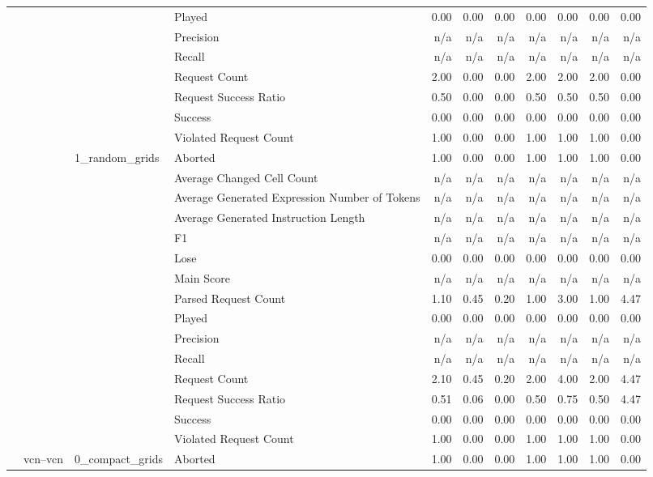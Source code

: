 \begin{tabular}{llllrrrrrrr}
 &  &  & Played & 0.00 & 0.00 & 0.00 & 0.00 & 0.00 & 0.00 & 0.00 \\
 &  &  & Precision & n/a & n/a & n/a & n/a & n/a & n/a & n/a \\
 &  &  & Recall & n/a & n/a & n/a & n/a & n/a & n/a & n/a \\
 &  &  & Request Count & 2.00 & 0.00 & 0.00 & 2.00 & 2.00 & 2.00 & 0.00 \\
 &  &  & Request Success Ratio & 0.50 & 0.00 & 0.00 & 0.50 & 0.50 & 0.50 & 0.00 \\
 &  &  & Success & 0.00 & 0.00 & 0.00 & 0.00 & 0.00 & 0.00 & 0.00 \\
 &  &  & Violated Request Count & 1.00 & 0.00 & 0.00 & 1.00 & 1.00 & 1.00 & 0.00 \\
\cline{3-11}
 &  & \multirow[t]{15}{*}{1_random_grids} & Aborted & 1.00 & 0.00 & 0.00 & 1.00 & 1.00 & 1.00 & 0.00 \\
 &  &  & Average Changed Cell Count & n/a & n/a & n/a & n/a & n/a & n/a & n/a \\
 &  &  & Average Generated Expression Number of Tokens & n/a & n/a & n/a & n/a & n/a & n/a & n/a \\
 &  &  & Average Generated Instruction Length & n/a & n/a & n/a & n/a & n/a & n/a & n/a \\
 &  &  & F1 & n/a & n/a & n/a & n/a & n/a & n/a & n/a \\
 &  &  & Lose & 0.00 & 0.00 & 0.00 & 0.00 & 0.00 & 0.00 & 0.00 \\
 &  &  & Main Score & n/a & n/a & n/a & n/a & n/a & n/a & n/a \\
 &  &  & Parsed Request Count & 1.10 & 0.45 & 0.20 & 1.00 & 3.00 & 1.00 & 4.47 \\
 &  &  & Played & 0.00 & 0.00 & 0.00 & 0.00 & 0.00 & 0.00 & 0.00 \\
 &  &  & Precision & n/a & n/a & n/a & n/a & n/a & n/a & n/a \\
 &  &  & Recall & n/a & n/a & n/a & n/a & n/a & n/a & n/a \\
 &  &  & Request Count & 2.10 & 0.45 & 0.20 & 2.00 & 4.00 & 2.00 & 4.47 \\
 &  &  & Request Success Ratio & 0.51 & 0.06 & 0.00 & 0.50 & 0.75 & 0.50 & 4.47 \\
 &  &  & Success & 0.00 & 0.00 & 0.00 & 0.00 & 0.00 & 0.00 & 0.00 \\
 &  &  & Violated Request Count & 1.00 & 0.00 & 0.00 & 1.00 & 1.00 & 1.00 & 0.00 \\
\cline{2-11} \cline{3-11}
 & \multirow[t]{30}{*}{vcn--vcn} & \multirow[t]{15}{*}{0_compact_grids} & Aborted & 1.00 & 0.00 & 0.00 & 1.00 & 1.00 & 1.00 & 0.00 \\

\end{tabular}
